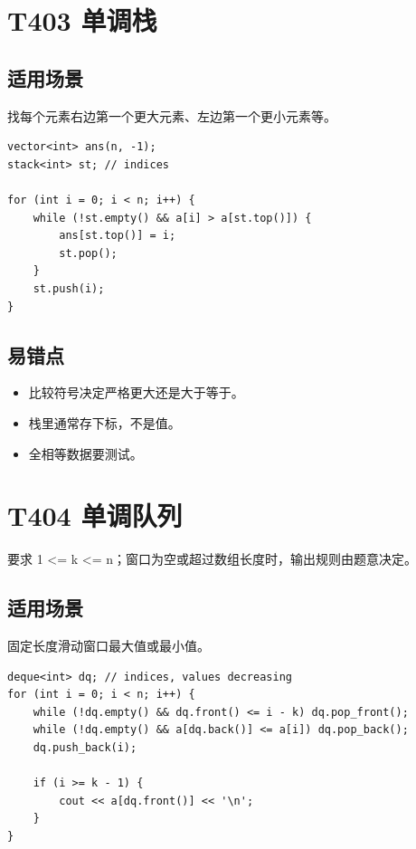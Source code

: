 \section{T403 单调栈}\label{sec:09-29}\label{tpl:403}

\subsection{适用场景}

找每个元素右边第一个更大元素、左边第一个更小元素等。

\begin{lstlisting}
vector<int> ans(n, -1);
stack<int> st; // indices

for (int i = 0; i < n; i++) {
    while (!st.empty() && a[i] > a[st.top()]) {
        ans[st.top()] = i;
        st.pop();
    }
    st.push(i);
}
\end{lstlisting}

\subsection{易错点}

\begin{itemize}
  \item 比较符号决定严格更大还是大于等于。
  \item 栈里通常存下标，不是值。
  \item 全相等数据要测试。
\end{itemize}

\section{T404 单调队列}\label{sec:09-30}\label{tpl:404}

要求 1 <= k <= n；窗口为空或超过数组长度时，输出规则由题意决定。

\subsection{适用场景}

固定长度滑动窗口最大值或最小值。

\begin{lstlisting}
deque<int> dq; // indices, values decreasing
for (int i = 0; i < n; i++) {
    while (!dq.empty() && dq.front() <= i - k) dq.pop_front();
    while (!dq.empty() && a[dq.back()] <= a[i]) dq.pop_back();
    dq.push_back(i);

    if (i >= k - 1) {
        cout << a[dq.front()] << '\n';
    }
}
\end{lstlisting}

